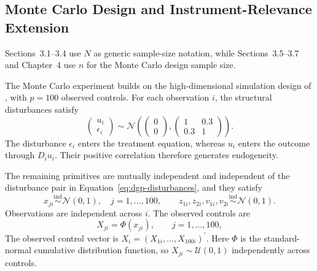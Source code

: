 \subsection{Monte Carlo Design and Instrument-Relevance Extension}
\label{sec:monte-carlo-design}

Sections~3.1--3.4 use $N$ as generic sample-size notation, while Sections~3.5--3.7 and Chapter~4 use $n$ for the Monte Carlo design sample size.


The Monte Carlo experiment builds on the high-dimensional simulation design of \textcite{chen_huang_tien_2021}, with $p=100$ observed controls. For each observation $i$, the structural disturbances satisfy
\begin{equation}
  \begin{pmatrix}
    u_i \\
    \epsilon_i
  \end{pmatrix}
  \sim
  \mathcal{N}\!\left(
    \begin{pmatrix} 0 \\ 0 \end{pmatrix},
    \begin{pmatrix} 1 & 0.3 \\ 0.3 & 1 \end{pmatrix}
  \right).
  \label{eq:dgp-disturbances}
\end{equation}
The disturbance $\epsilon_i$ enters the treatment equation, whereas $u_i$ enters the outcome through $D_i u_i$. Their positive correlation therefore generates endogeneity.

The remaining primitives are mutually independent and independent of the disturbance pair in Equation~\eqref{eq:dgp-disturbances}, and they satisfy
\begin{equation}
  x_{ji}\overset{\mathrm{ind}}{\sim}\mathcal{N}(0,1),
  \quad j=1,\ldots,100,
  \qquad
  z_{1i},z_{2i},v_{1i},v_{2i}
  \overset{\mathrm{ind}}{\sim}\mathcal{N}(0,1).
  \label{eq:dgp-primitives}
\end{equation}
Observations are independent across $i$. The observed controls are
\begin{equation}
  X_{ji}=\Phi(x_{ji}),
  \qquad j=1,\ldots,100,
  \label{eq:dgp-controls}
\end{equation}
The observed control vector is $X_i=(X_{1i},\ldots,X_{100i})^{\prime}$. Here $\Phi$ is the standard-normal cumulative distribution function, so $X_{ji}\sim\mathcal{U}(0,1)$ independently across controls.

